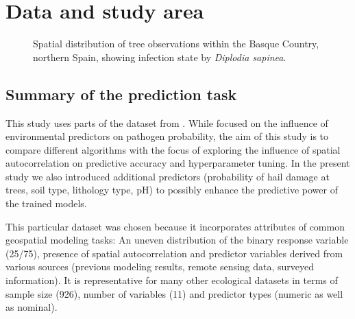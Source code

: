 \documentclass[review]{elsarticle}
\begin{document}
\section{Data and study area}

\begin{figure} [t!]
	\begin{center}
		\caption[Study area]{Spatial distribution of tree observations within the Basque Country, northern Spain, showing infection state by \textit{Diplodia sapinea}.}
		\label{fig: study_area}
	\end{center}
\end{figure}

\subsection{Summary of the prediction task}
This study uses parts of the dataset from \cite{Iturritxa2014}.
While \cite{Iturritxa2014} focused on the influence of environmental predictors on pathogen probability, the aim of this study is to compare different algorithms with the focus of exploring the influence of spatial autocorrelation on predictive accuracy and hyperparameter tuning.
In the present study we also introduced additional predictors (probability of hail damage at trees, soil type, lithology type, pH) to possibly enhance the predictive power of the trained models.

This particular dataset was chosen because it incorporates attributes of common geospatial modeling tasks:
An uneven distribution of the binary response variable (25/75), presence of spatial autocorrelation and predictor variables derived from various sources (previous modeling results, remote sensing data, surveyed information).
It is representative for many other ecological datasets in terms of sample size (926), number of variables (11) and predictor types (numeric as well as nominal).
\end{document}

